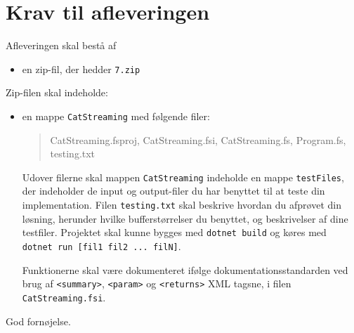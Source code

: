 \documentclass[a4paper,12pt]{article}
\newcommand{\exerciseNumber}{7}
\begin{document}
\section*{Krav til afleveringen}

Afleveringen skal bestå af
\begin{itemize}
  \item en zip-fil, der hedder \texttt{\exerciseNumber\typeLetter.zip}
\end{itemize}
Zip-filen skal indeholde:
\begin{itemize}
\item en mappe \texttt{CatStreaming} med følgende filer:
  \begin{quote}
    CatStreaming.fsproj, CatStreaming.fsi, CatStreaming.fs, Program.fs, testing.txt
  \end{quote}
  Udover filerne skal mappen \texttt{CatStreaming} indeholde en mappe \texttt{testFiles}, der indeholder de input og output-filer du har benyttet til at teste din implementation. Filen \texttt{testing.txt} skal beskrive hvordan du afprøvet din løsning, herunder hvilke bufferstørrelser du benyttet, og beskrivelser af dine testfiler. 
  Projektet skal kunne bygges med \texttt{dotnet build} og køres med \\ \texttt{dotnet run [fil1 fil2 ... filN]}.
  
  Funktionerne skal være dokumenteret ifølge dokumentationsstandarden ved brug af \verb|<summary>|, \verb|<param>| og \verb|<returns>| XML tagsne, i filen \texttt{CatStreaming.fsi}.
\end{itemize}

\flushright God fornøjelse.
\end{document}
